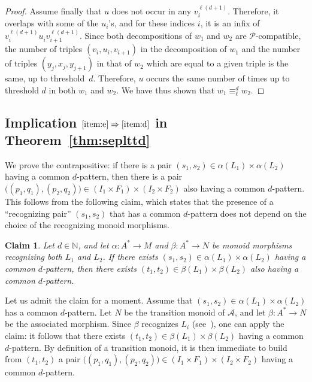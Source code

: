 \documentclass{LMCS}
\newcommand\nat{\ensuremath{\mathbb{N}}\xspace}
\newcommand\As{\ensuremath{\mathcal{A}}\xspace}
\newcommand\Ps{\ensuremath{\mathcal{P}}\xspace}
\newcommand\ltteq[2]{\ensuremath{\equiv_{#1}^{#2}}\xspace}
\theoremstyle{plain}
\newtheorem*{claim}{Claim}
\begin{document}
\begin{proof}
  Assume finally that $u$ does not occur in any
  $v_i^{\ell(d+1)}$. Therefore, it overlaps with some of the $u_i$'s, and
  for these indices $i$, it is an infix of
  $v_i^{\ell(d+1)}u^{}_iv_{i+1}^{\ell(d+1)}$. Since both decompositions of
  $w_1$ and $w_2$ are \Ps-compatible, the number of triples
  $(v_i,u_i,v_{i+1})$ in the decomposition of $w_1$ and the
  number of triples $(y_j,x_j,y_{j+1})$ in that of $w_2$ which are equal to a given
  triple is the same, up to threshold~$d$. Therefore, $u$ occurs the
  same number of times up to threshold $d$ in both $w_1$ and
  $w_2$. We have thus shown that $w_1 \ltteq{\ell}{d} w_2$.
\end{proof}

\subsection{\texorpdfstring{Implication $\eqref{item:e} \Rightarrow \eqref{item:d}$ in
  Theorem~\ref{thm:seplttd}}{{Implication  (\ref{item:e}) => (\ref{item:d}) in
  Theorem \ref{thm:seplttd}}}}

We prove the contrapositive: if there is a pair
$(s_1,s_2)\in\alpha(L_1)\times\alpha(L_2)$ having a common $d$-pattern,
then there is a pair $\bigl((p_1,q_1),(p_2,q_2)\bigr)\in(I_1\times F_1)
\times(I_2\times F_2)$ also having a common $d$-pattern.  This follows from
the following claim, which states that the presence of a ``recognizing pair''
$(s_1,s_2)$ that has a common $d$-pattern does not depend on the choice of the
recognizing monoid morphisms.
\begin{claim}
  Let $d\in\nat$, and let $\alpha:A^*\to M$ and
  $\beta:A^*\to N$ be monoid morphisms recognizing both $L_1$ and $L_2$. If there exists
  $(s_1,s_2)\in \alpha(L_1)\times \alpha(L_2)$ having a common
  $d$-pattern, then there exists $(t_1,t_2)\in \beta(L_1)\times
  \beta(L_2)$ also having a common $d$-pattern.
\end{claim}

Let us admit the claim for a moment. Assume that
$(s_1,s_2)\in\alpha(L_1)\times\alpha(L_2)$ has a common $d$-pattern. Let $N$ be the transition monoid of $\As$, and let
$\beta:A^*\to N$ be the associated morphism. Since $\beta$ recognizes
$L_i$ (see~\cite{pin:hal-00143946}), one can apply the claim: it follows that there exists
$(t_1,t_2)\in\beta(L_1)\times\beta(L_2)$ having a common $d$-pattern. By
definition of a transition monoid, it is then immediate to build from
$(t_1,t_2)$ a pair $\bigl((p_1,q_1),(p_2,q_2)\bigr)\in(I_1\times F_1)
\times(I_2\times F_2)$ having a common $d$-pattern.
\end{document}
